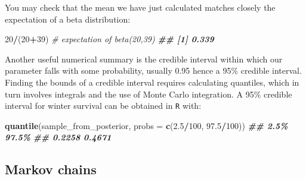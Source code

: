 \documentclass[
  12pt,
]{krantz}
\newenvironment{Shaded}{\begin{snugshade}}{\end{snugshade}}
\newcommand{\AttributeTok}[1]{\textcolor[rgb]{0.13,0.29,0.53}{#1}}
\newcommand{\CommentTok}[1]{\textcolor[rgb]{0.56,0.35,0.01}{\textit{#1}}}
\newcommand{\DecValTok}[1]{\textcolor[rgb]{0.00,0.00,0.81}{#1}}
\newcommand{\DocumentationTok}[1]{\textcolor[rgb]{0.56,0.35,0.01}{\textbf{\textit{#1}}}}
\newcommand{\FloatTok}[1]{\textcolor[rgb]{0.00,0.00,0.81}{#1}}
\newcommand{\FunctionTok}[1]{\textcolor[rgb]{0.13,0.29,0.53}{\textbf{#1}}}
\newcommand{\NormalTok}[1]{#1}
\newcommand{\SpecialCharTok}[1]{\textcolor[rgb]{0.81,0.36,0.00}{\textbf{#1}}}
\begin{document}
You may check that the mean we have just calculated matches closely the expectation of a beta distribution:

\begin{Shaded}
\begin{Highlighting}[]
\DecValTok{20}\SpecialCharTok{/}\NormalTok{(}\DecValTok{20}\SpecialCharTok{+}\DecValTok{39}\NormalTok{) }\CommentTok{\# expectation of beta(20,39)}
\DocumentationTok{\#\# [1] 0.339}
\end{Highlighting}
\end{Shaded}

Another useful numerical summary is the credible interval within which our parameter falls with some probability, usually 0.95 hence a 95\(\%\) credible interval. Finding the bounds of a credible interval requires calculating quantiles, which in turn involves integrals and the use of Monte Carlo integration. A 95\(\%\) credible interval for winter survival can be obtained in \texttt{R} with:

\begin{Shaded}
\begin{Highlighting}[]
\FunctionTok{quantile}\NormalTok{(sample\_from\_posterior, }\AttributeTok{probs =} \FunctionTok{c}\NormalTok{(}\FloatTok{2.5}\SpecialCharTok{/}\DecValTok{100}\NormalTok{, }\FloatTok{97.5}\SpecialCharTok{/}\DecValTok{100}\NormalTok{))}
\DocumentationTok{\#\#   2.5\%  97.5\% }
\DocumentationTok{\#\# 0.2258 0.4671}
\end{Highlighting}
\end{Shaded}

\subsection{Markov chains}\label{markovmodelmcmc}
\end{document}
